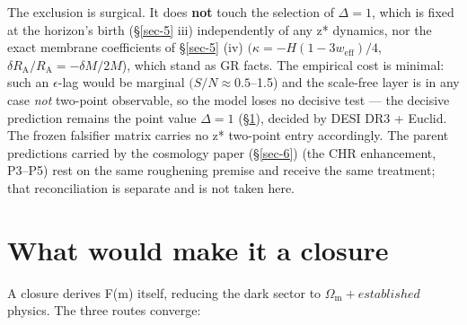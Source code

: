 \documentclass[aps,prd,preprint,nofootinbib,superscriptaddress]{revtex4-2}
\begin{document}
The exclusion is surgical. It does \textbf{not} touch the selection of
\(\Delta  = 1\), which is fixed at the horizon's birth (§\ref{sec-5}
iii) independently of any z* dynamics, nor the exact membrane
coefficients of §\ref{sec-5} (iv)
\((\kappa  = -H(1 - 3w_{\mathrm{eff}})/4\),
\(\delta R_{\mathrm{A}}/R_{\mathrm{A}} = -\delta M/2M\)), which stand as
GR facts. The empirical cost is minimal: such an \(\epsilon\)-lag would
be marginal \((S/N \approx  0.5\)--1.5) and the scale-free layer is in
any case \emph{not} two-point observable, so the model loses no decisive
test --- the decisive prediction remains the point value \(\Delta  = 1\)
(§\ref{sec-7}), decided by DESI DR3 + Euclid. The frozen falsifier
matrix carries no z* two-point entry accordingly. The parent predictions
carried by the cosmology paper (§\ref{sec-6})
\cite{Pandev:2026cosmology} (the CHR enhancement, P3--P5) rest on the
same roughening premise and receive the same treatment; that
reconciliation is separate and is not taken here.

\section{What would make it a closure}\label{sec-7}

A closure derives F(m) itself, reducing the dark sector to
\(\Omega _{\mathrm{m}} + established\) physics. The three routes
converge:
\end{document}
